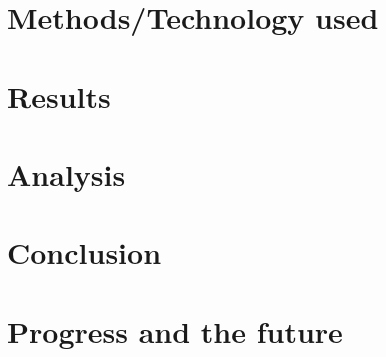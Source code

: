 \documentclass[12pt]{report}
\begin{document}
\chapter{Methods/Technology used}

\chapter{Results}

\chapter{Analysis}

\chapter{Conclusion}

\chapter{Progress and the future}


\end{document}
